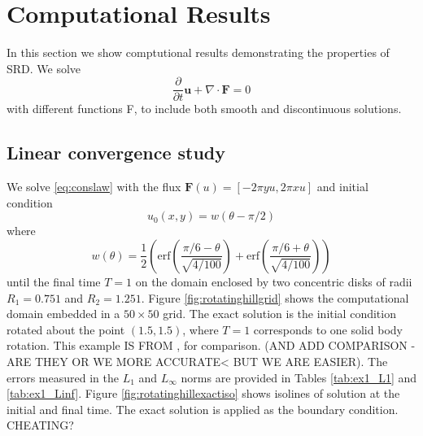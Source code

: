 \section{Computational Results}\label{sec:compResults}
In this section we show comptutional results demonstrating the properties of SRD.
We solve
\begin{equation} \label{eq:conslaw}
   \frac{\partial}{\partial t} \mathbf{u} + \nabla \cdot \mathbf{F} = 0
\end{equation}
with different functions F, to include both smooth and discontinuous
solutions.

\subsection{Linear convergence study}
We solve \eqref{eq:conslaw} with the flux $\mathbf{F}(u) = [-2\pi y u, 2\pi x u]$ and initial condition
$$
u_0(x,y) = w(\theta - \pi/2)
$$
where
$$
w(\theta) = \frac{1}{2}\left( \text{erf}\left( \frac{\pi/6 - \theta}{\sqrt{4/100}} \right) + \text{erf}\left( \frac{\pi/6 + \theta}{\sqrt{4/100}} \right)\right)
$$
until the final time $T = 1$ on the domain enclosed by two concentric disks of 
radii $R_1 = 0.751$ and $R_2 = 1.251$.  
Figure \ref{fig:rotatinghillgrid} shows the computational domain 
embedded in a $50 \times 50$ grid.  The exact solution is the initial condition 
rotated about the point $(1.5,1.5)$, where $T=1$ corresponds to one solid 
body rotation. This example IS FROM \cite{}, for comparison.  (AND ADD
COMPARISON - ARE THEY OR WE MORE ACCURATE< BUT WE ARE EASIER).   The errors 
measured in the $L_1$ and $L_\infty$ norms are provided in 
Tables \ref{tab:ex1_L1} and \ref{tab:ex1_Linf}.  Figure
\ref{fig:rotatinghillexactiso} shows isolines of solution at the initial 
and final time.  The exact solution is applied as the boundary condition.
CHEATING?

